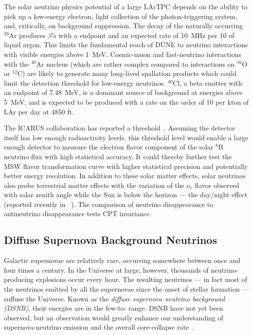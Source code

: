The solar neutrino physics potential of a large LArTPC depends
on the ability to pick up a low-energy electron, light collection of the photon-triggering system,
and, critically, on background suppression. 
The decay of the naturally occurring $^{39}$Ar
produces $\beta$'s with a  endpoint and an expected rate
of \SI{10}{\MHz} per \SI{10}{\kt} of liquid argon. This limits the
fundamental reach of DUNE to neutrino interactions with visible
energies above \SI{1}{\MeV}. 
Cosmic-muon and fast-neutrino  interactions with the $^{40}$Ar nucleus (which are rather complex
compared to interactions on $^{16}$O or $^{12}$C) are likely to generate many long-lived spallation products which could limit the
detection threshold for low-energy neutrinos.
$^{40}$Cl, a beta emitter with an
endpoint of \SI{7.48}{\MeV}, is a dominant source of background at
energies above \SI{5}{\MeV}, and is expected to be produced with a rate on the order of 10 per kton of LAr per day at 4850 ft.



The ICARUS collaboration has reported a 
threshold~\cite{Guglielmi:2012}. Assuming the detector itself
has low enough radioactivity levels, this threshold level would enable
a large enough detector to measure the electron flavor component of
the solar $^8$B neutrino flux with high statistical accuracy. It could 
thereby further test the MSW flavor transformation curve with higher statistical precision and
potentially better energy resolution. 
In addition to these solar
matter effects, solar 
neutrinos also probe terrestrial matter effects
with the variation of the $\nu_e$ flavor observed with solar zenith
angle while the Sun is below the horizon --- the day/night effect (reported recently in ~\cite{Renshaw:2013dzu}). 
The comparison
of neutrino disappearance to antineutrino disappearance tests CPT
invariance. 


\subsection{Diffuse Supernova Background Neutrinos}

Galactic supernovae are relatively rare, occurring somewhere between
once and four times a century. In the Universe
at large, however, thousands of neutrino-producing explosions occur
every hour.  The resulting neutrinos --- in fact most of the neutrinos
emitted by all the supernovae since the onset of stellar formation ---
suffuse the Universe.  Known as the \emph{diffuse supernova neutrino background
  (DSNB)}, their energies are in the few-to- range.  DSNB
have not yet been observed, but an observation would greatly enhance
our understanding of supernova-neutrino emission and the overall
core-collapse rate~\cite{Beacom:2010kk}.


